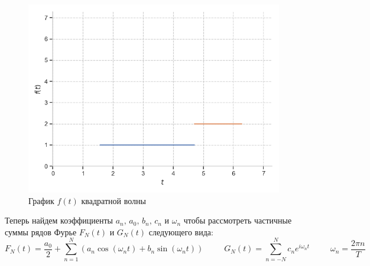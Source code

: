 \documentclass[a4paper, 16pt]{article}
\begin{document}
\begin{figure}[!htb]
    \centering
    \includegraphics[scale=0.8]{f(t)sqwave.png}
    \captionsetup{skip=0pt}
    \caption{График $f(t)$ квадратной волны}
    \label{Рис:1}
\end{figure}


\noindent Теперь найдем коэффициенты $a_n,\,a_0,\,b_n,\,c_n$ и $\omega_n$ чтобы рассмотреть
частичные суммы рядов Фурье $F_N(t)$ и $G_N(t)$ следующего вида:
$$F_N(t)=\frac{a_0}{2}+\sum_{n=1}^{N}(a_n\cos{(\omega_n t)}+b_n\sin{(\omega_n t)})\,\,\,\,\,\,\,\,\,\,\,\,\,\,\,
G_N(t)=\sum_{n=-N}^{N}c_n e^{i \omega_n t}\,\,\,\,\,\,\,\,\,\,\,\,\,\,\,\omega_n=\frac{2\pi n}{T}$$
\end{document}
